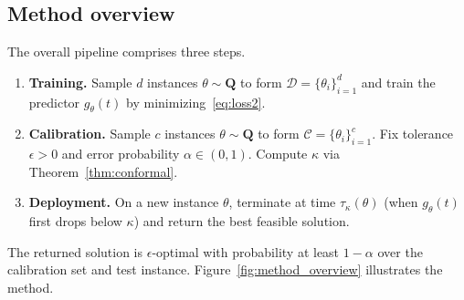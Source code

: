 \documentclass[12pt]{article}
\renewcommand{\cite}[1]{\citep{#1}}
\theoremstyle{definition}
\theoremstyle{remark}
\newcommand{\bnote}[1]{}
\renewcommand{\bnote}[1]{\textcolor{blue}{\textbf{\small [B: #1]}}}
\newcommand{\paramdist}{\mathbf{Q}}
\newcommand{\param}{\theta}
\newcommand{\truegap}{g}
\newcommand{\tol}{\epsilon}
\newcommand{\errorprob}{\alpha}
\newcommand{\pst}{\hat{\tau}}
\newcommand{\calibration}{\mathcal{C}}
\newcommand{\lt}{\kappa}
\newcommand{\ncalib}{c}
\newcommand{\train}{\mathcal{D}}
\newcommand{\ntrain}{d}
\newcommand{\bnote}[1]{}
\renewcommand{\bnote}[1]{\textcolor{blue}{\textbf{\small [B: #1]}}}
\newcommand{\paramdist}{\mathbf{Q}}
\newcommand{\param}{\theta}
\newcommand{\truegap}{g}
\newcommand{\tol}{\epsilon}
\newcommand{\errorprob}{\alpha}
\newcommand{\pst}{\hat{\tau}}
\newcommand{\calibration}{\mathcal{C}}
\newcommand{\lt}{\kappa}
\newcommand{\ncalib}{c}
\newcommand{\train}{\mathcal{D}}
\newcommand{\ntrain}{d}
\theoremstyle{plain}
\theoremstyle{definition}
\theoremstyle{remark}
\begin{document}

\subsection{Method overview} \label{sec:overview}
The overall pipeline comprises three steps.
\begin{enumerate}
    \item \textbf{Training.} Sample $\ntrain$ instances $\param \sim \paramdist$ to form $\train = \{\param_i\}_{i=1}^\ntrain$ and train the predictor $\truegap_\param(t)$ by minimizing~\eqref{eq:loss2}.
    \item \textbf{Calibration.} Sample $\ncalib$ instances $\param \sim \paramdist$ to form $\calibration = \{\param_i\}_{i=1}^\ncalib$.
    Fix tolerance $\tol > 0$ and error probability $\errorprob \in (0,1)$.
    Compute $\lt$ via Theorem~\ref{thm:conformal}.
    \item \textbf{Deployment.} On a new instance $\param$, terminate at time $\pst_\lt(\param)$ (when $\truegap_\param(t)$ first drops below $\lt$) and return the best feasible solution.
\end{enumerate}
The returned solution is $\tol$-optimal with probability at least $1 - \errorprob$ over the calibration set and test instance.
Figure~\ref{fig:method_overview} illustrates the method.

\end{document}
